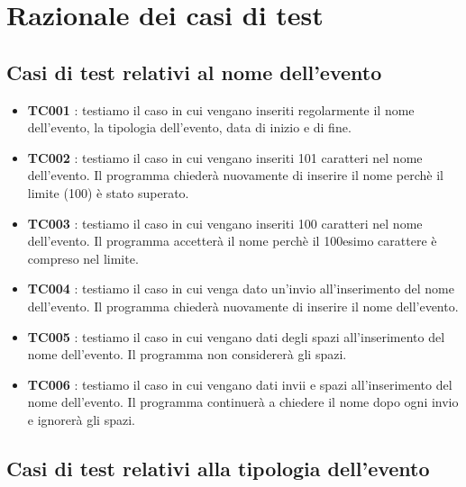 \documentclass[11pt]{scrartcl} %
\begin{document}
\section{Razionale dei casi di test}

\subsection{Casi di test relativi al nome dell'evento}

\begin{itemize}
	\item \textbf{TC001} : testiamo il caso in cui vengano inseriti regolarmente il nome dell’evento, la tipologia dell’evento, data di inizio e di fine.

	\item \textbf{TC002} : testiamo il caso in cui vengano inseriti 101 caratteri nel nome dell’evento. Il programma chiederà nuovamente di inserire il nome perchè il limite (100) è stato superato.

	\item \textbf{TC003} : testiamo il caso in cui vengano inseriti 100 caratteri nel nome dell’evento. Il programma accetterà il nome perchè il 100esimo carattere è compreso nel limite.

	\item \textbf{TC004} : testiamo il caso in cui venga dato un’invio all’inserimento del nome dell’evento. Il programma chiederà nuovamente di inserire il nome dell’evento.

	\item \textbf{TC005} : testiamo il caso in cui vengano dati degli spazi all’inserimento del nome dell’evento. Il programma non considererà gli spazi.

	\item \textbf{TC006} : testiamo il caso in cui vengano dati invii e spazi all’inserimento del nome dell’evento. Il programma continuerà a chiedere il nome dopo ogni invio e ignorerà gli spazi.

\end{itemize}


\subsection{Casi di test relativi alla tipologia dell'evento}
\end{document}
